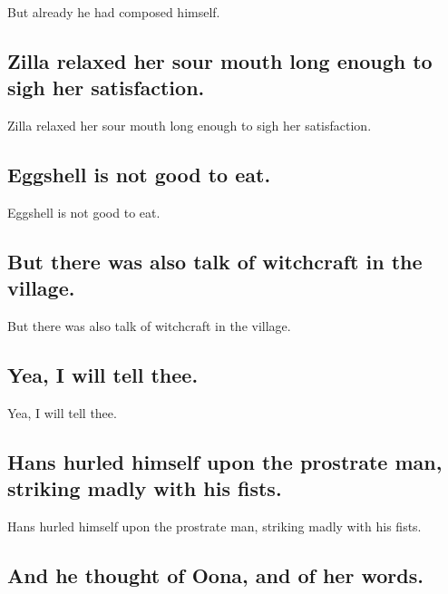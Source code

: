 \documentclass[]{article}
\begin{document}
But already he had composed himself.

\hypertarget{zilla-relaxed-her-sour-mouth-long-enough-to-sigh-her-satisfaction.}{%
\subsection{Zilla relaxed her sour mouth long enough to sigh her
satisfaction.}\label{zilla-relaxed-her-sour-mouth-long-enough-to-sigh-her-satisfaction.}}

Zilla relaxed her sour mouth long enough to sigh her satisfaction.

\hypertarget{eggshell-is-not-good-to-eat.}{%
\subsection{Eggshell is not good to
eat.}\label{eggshell-is-not-good-to-eat.}}

Eggshell is not good to eat.

\hypertarget{but-there-was-also-talk-of-witchcraft-in-the-village.}{%
\subsection{But there was also talk of witchcraft in the
village.}\label{but-there-was-also-talk-of-witchcraft-in-the-village.}}

But there was also talk of witchcraft in the village.

\hypertarget{yea-i-will-tell-thee.}{%
\subsection{Yea, I will tell thee.}\label{yea-i-will-tell-thee.}}

Yea, I will tell thee.

\hypertarget{hans-hurled-himself-upon-the-prostrate-man-striking-madly-with-his-fists.}{%
\subsection{Hans hurled himself upon the prostrate man, striking madly
with his
fists.}\label{hans-hurled-himself-upon-the-prostrate-man-striking-madly-with-his-fists.}}

Hans hurled himself upon the prostrate man, striking madly with his
fists.

\hypertarget{and-he-thought-of-oona-and-of-her-words.}{%
\subsection{And he thought of Oona, and of her
words.}\label{and-he-thought-of-oona-and-of-her-words.}}
\end{document}
